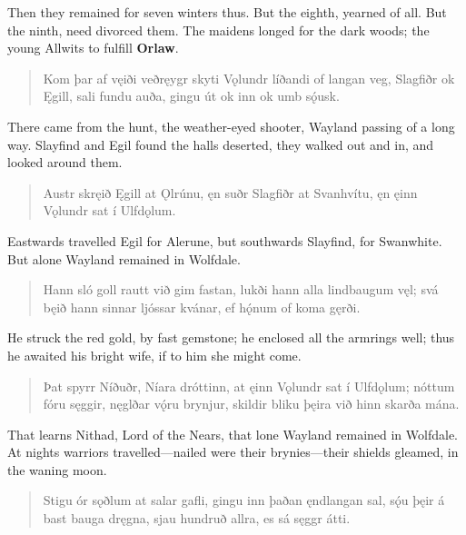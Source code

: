 \bvb Then they remained for seven winters thus. But the eighth, yearned of all. But the ninth, need divorced them. The maidens longed for the dark woods; the young Allwits to fulfill \textbf{Orlaw}.

\begin{verse}
\bva Kom þar af vęiði \hld veðręygr skyti
Vǫlundr líðandi \hld of langan veg,
Slagfiðr ok Ęgill, \hld sali fundu auða,
gingu út ok inn \hld ok umb sǫ́usk. \\%
\end{verse}

\bvb There came from the hunt, the weather-eyed shooter, Wayland passing of a long way. Slayfind and Egil found the halls deserted, they walked out and in, and looked around them.

\begin{verse}
\bva Austr skręið Ęgill \hld at Ǫlrúnu,
ęn suðr Slagfiðr \hld at Svanhvítu,
ęn ęinn Vǫlundr \hld sat í Ulfdǫlum. \\%
\end{verse}

\bvb Eastwards travelled Egil for Alerune, but southwards Slayfind, for Swanwhite. But alone Wayland remained in Wolfdale.

\begin{verse}
\bva Hann sló goll rautt \hld við gim fastan,
lukði hann alla \hld lindbaugum vęl;
svá bęið hann \hld sinnar ljóssar
kvánar, ef hǫ́num \hld of koma gęrði. \\%
\end{verse}

\bvb He struck the red gold, by fast gemstone; he enclosed all the armrings well; thus he awaited his bright wife, if to him she might come.

\begin{verse}
\bva Þat spyrr Níðuðr, \hld Níara dróttinn,
at ęinn Vǫlundr \hld sat í Ulfdǫlum;
nóttum fóru sęggir, \hld nęglðar vǫ́ru brynjur,
skildir bliku þęira \hld við hinn skarða mána. \\%
\end{verse}

\bvb That learns Nithad, Lord of the Nears, that lone Wayland remained in Wolfdale. At nights warriors travelled—nailed were their brynies—their shields gleamed, in the waning moon.

\begin{verse}
\bva Stigu ór sǫðlum \hld at salar gafli,
gingu inn þaðan \hld ęndlangan sal,
sǫ́u þęir á bast \hld bauga dręgna,
sjau hundruð allra, \hld es sá sęggr átti. \\%
\end{verse}

